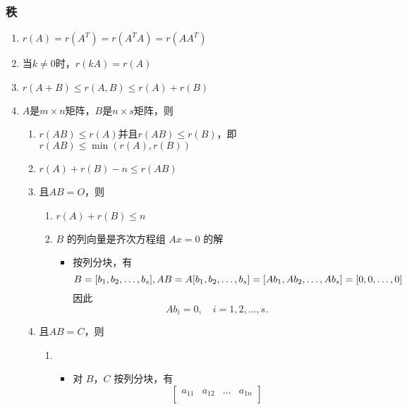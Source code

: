 \documentclass[a4paper,12pt]{article}
\begin{document}
    \subsubsection{秩}

    \begin{enumerate}
        \item $r(A) = r(A^T) = r(A^{T}A) = r(AA^{T})$
        \item 当$k \neq 0$时，$r(kA) = r(A)$
        \item $r(A + B) \le r(A, B) \le r(A) + r(B)$
        \item $A$是$m \times n$矩阵，$B$是$n \times s$矩阵，则
        \begin{enumerate}
            \item $r(AB) \le r(A) \text{并且} r(AB) \le r(B)$，即 $r(AB) \le \min(r(A), r(B))$
            \item $r(A) + r(B) - n \le r(AB)$
            \item 且$AB = O$，则
            \begin{enumerate}
                \item $r(A) + r(B) \le n$
                \item $B$ 的列向量是齐次方程组 $Ax = 0$ 的解
                \begin{itemize}
                    \item 按列分块，有
                    \[
                        B = [b_1, b_2, \dots, b_s], \\
                        AB = A[b_1, b_2, \dots, b_s] = [Ab_1, Ab_2, \dots, Ab_s] = [0, 0, \dots, 0]
                    \]
                    因此
                    \[
                        Ab_i = 0, \quad i = 1, 2, \dots, s.
                    \]
                \end{itemize}
            \end{enumerate}
            \item 且$AB = C$，则
            \begin{enumerate}
                \item {\color[rgb]{0.2, 0.6, 0.3}{矩阵$C(AB)$的行向量$\alpha_1, \alpha_2, \dots, \alpha_n$可由$B$的行向量$\beta_1, \beta_2, \dots, \beta_n$线性表出}}
                \begin{itemize}
                    \item 对 $B$，$C$ 按列分块，有
                    \[
                        \begin{bmatrix}
                            a_{11} & a_{12} & \dots & a_{1n} \\

\end{bmatrix}\]
\end{itemize}
\end{enumerate}
\end{enumerate}
\end{enumerate}
\end{document}

